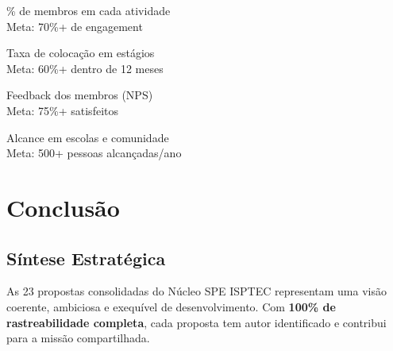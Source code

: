 \documentclass[12pt,a4paper,oneside]{article}
\begin{document}
\begin{tcbraster}[raster columns=2, nobeforeafter]

\begin{tcolorbox}[title=Participação, colback=spe-light, boxrule=0.5pt]
  \% de membros em cada atividade\\
  Meta: 70\%+ de engagement
\end{tcolorbox}

\begin{tcolorbox}[title=Empregabilidade, colback=spe-light, boxrule=0.5pt]
  Taxa de colocação em estágios\\
  Meta: 60\%+ dentro de 12 meses
\end{tcolorbox}

\begin{tcolorbox}[title=Satisfação, colback=spe-light, boxrule=0.5pt]
  Feedback dos membros (NPS)\\
  Meta: 75\%+ satisfeitos
\end{tcolorbox}

\begin{tcolorbox}[title=Impacto Social, colback=spe-light, boxrule=0.5pt]
  Alcance em escolas e comunidade\\
  Meta: 500+ pessoas alcançadas/ano
\end{tcolorbox}

\end{tcbraster}

\newpage


\section*{Conclusão}

\subsection*{Síntese Estratégica}

As 23 propostas consolidadas do Núcleo SPE ISPTEC representam uma visão coerente, ambiciosa e exequível de desenvolvimento. Com \textbf{100\% de rastreabilidade completa}, cada proposta tem autor identificado e contribui para a missão compartilhada.

\vspace{1cm}
\end{document}
